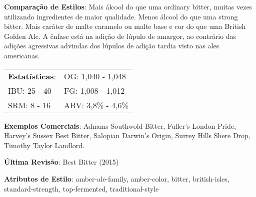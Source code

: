 \textbf{Comparação de Estilos}: Mais álcool do que uma ordinary bitter, muitas vezes utilizando ingredientes de maior qualidade. Menos álcool do que uma strong bitter. Mais caráter de malte caramelo ou malte base e cor do que uma British Golden Ale. A ênfase está na adição de lúpulo de amargor, ao contrário das adições agressivas advindas dos lúpulos de adição tardia visto nas ales americanas.

\begin{tabular}{@{}p{35mm}p{35mm}@{}}
  \textbf{Estatísticas}: & OG: 1,040 - 1,048 \\
  IBU: 25 - 40  & FG: 1,008 - 1,012  \\
  SRM: 8 - 16  & ABV: 3,8\% - 4,6\%
\end{tabular}

\textbf{Exemplos Comerciais}: Adnams Southwold Bitter, Fuller's London Pride, Harvey's Sussex Best Bitter, Salopian Darwin’s Origin, Surrey Hills Shere Drop, Timothy Taylor Landlord.

\textbf{Última Revisão}: Best Bitter (2015)

\textbf{Atributos de Estilo}: amber-ale-family, amber-color, bitter, british-isles, standard-strength, top-fermented, traditional-style
